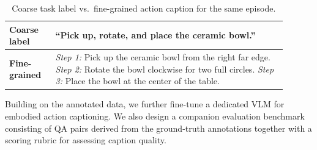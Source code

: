 \documentclass{llmxive}
\begin{document}
\begin{table}[!htbp]
\centering
\setlength{\tabcolsep}{4pt}
\begin{tabular}{p{0.15\linewidth} p{0.75\linewidth}}
\toprule
\textbf{Coarse label} & ``Pick up, rotate, and place the ceramic bowl.'' \\
\midrule
\textbf{Fine-grained} &
  \textit{Step 1:} Pick up the ceramic bowl from the right far edge. \newline
  \textit{Step 2:} Rotate the bowl clockwise for two full circles. \newline
  \textit{Step 3:} Place the bowl at the center of the table. \\
\bottomrule
\end{tabular}
\caption{Coarse task label vs.\ fine-grained action caption for the same episode.}
\label{tab:caption-example}
\end{table}

Building on the annotated data, we further fine-tune a dedicated VLM for
embodied action captioning. We also design a companion evaluation
benchmark consisting of QA pairs derived from the ground-truth
annotations together with a scoring rubric for assessing caption quality.
\end{document}
